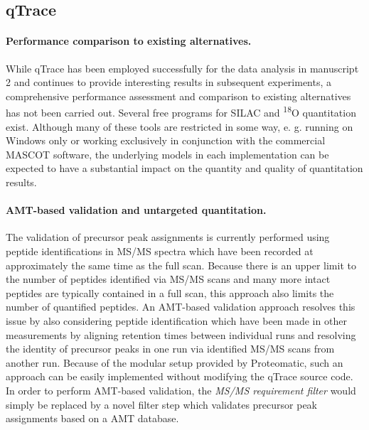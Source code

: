 
\subsection{qTrace}

\paragraph{Performance comparison to existing alternatives.}

While qTrace has been employed successfully for the data analysis in 
manuscript 2 and continues to provide interesting results in subsequent 
experiments, a comprehensive performance assessment and comparison to existing 
alternatives has not been carried out.
Several free programs for SILAC \citep{Kohlbacher2007, Cox2008, Mortensen2010} 
and \textsuperscript{18}O quantitation \citep{Halligan2005, Shinkawa2005} exist.
Although many of these tools are restricted in some way, e. g. running on
Windows only or working exclusively in conjunction with the commercial MASCOT
software, the underlying models in each implementation can be expected to
have a substantial impact on the quantity and quality of quantitation results.

\paragraph{AMT-based validation and untargeted quantitation.}

The validation of precursor peak assignments is currently performed using
peptide identifications in MS/MS spectra which have been recorded at 
approximately the same time as the full scan.
Because there is an upper limit to the number of peptides identified via MS/MS
scans and many more intact peptides are typically contained in a full scan,
this approach also limits the number of quantified peptides.
An AMT-based validation approach \citep{Mueller2007} resolves this issue by
also considering peptide identification which have been made in other 
measurements by aligning retention times between individual runs and 
resolving the identity of precursor peaks in one run via identified MS/MS scans
from another run.
Because of the modular setup provided by Proteomatic, such an approach can
be easily implemented without modifying the qTrace source code.
In order to perform AMT-based validation, the {\em MS/MS requirement filter}
would simply be replaced by a novel filter step which validates precursor
peak assignments based on a AMT database.

